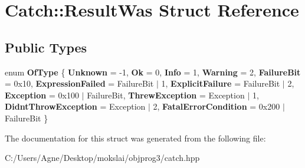 \hypertarget{struct_catch_1_1_result_was}{}\section{Catch\+:\+:Result\+Was Struct Reference}
\label{struct_catch_1_1_result_was}
\subsection*{Public Types}
\begin{DoxyCompactItemize}
\item 
\mbox{\label{struct_catch_1_1_result_was_a624e1ee3661fcf6094ceef1f654601ef}} 
enum {\bfseries Of\+Type} \{ \newline
{\bfseries Unknown} = -\/1, 
{\bfseries Ok} = 0, 
{\bfseries Info} = 1, 
{\bfseries Warning} = 2, 
\newline
{\bfseries Failure\+Bit} = 0x10, 
{\bfseries Expression\+Failed} = Failure\+Bit $\vert$ 1, 
{\bfseries Explicit\+Failure} = Failure\+Bit $\vert$ 2, 
{\bfseries Exception} = 0x100 $\vert$ Failure\+Bit, 
\newline
{\bfseries Threw\+Exception} = Exception $\vert$ 1, 
{\bfseries Didnt\+Throw\+Exception} = Exception $\vert$ 2, 
{\bfseries Fatal\+Error\+Condition} = 0x200 $\vert$ Failure\+Bit
 \}
\end{DoxyCompactItemize}


The documentation for this struct was generated from the following file\+:\begin{DoxyCompactItemize}
\item 
C\+:/\+Users/\+Agne/\+Desktop/mokslai/objprog3/catch.\+hpp\end{DoxyCompactItemize}
